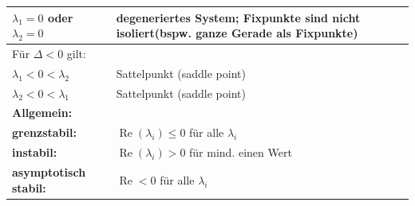 \begin{longtable}{|p{}|p{}|}
	\hline $\lambda_1 = 0$ oder $\lambda_2 = 0$ & degeneriertes System; Fixpunkte sind nicht isoliert(bspw. ganze Gerade als Fixpunkte) \\
	\hline
	
	\multicolumn{2}{l}{Für $\Delta < 0$ gilt:} \\
	
	\hline $\lambda_1 < 0 < \lambda_2$ & Sattelpunkt (saddle point) \\
	\hline $\lambda_2 < 0 < \lambda_1$ & Sattelpunkt (saddle point) \\
	\hline
	
	\multicolumn{2}{l}{\textbf{Allgemein:}}\\
	
	\hline
	\textbf{grenzstabil:} & $\operatorname{Re}(\lambda_i) \leq 0$ für alle $\lambda_i$ \\
	\textbf{instabil:} & $\operatorname{Re}(\lambda_i) > 0$ für mind. einen Wert \\
	\textbf{asymptotisch stabil:} &$\operatorname{Re} < 0$ für alle $\lambda_i$ \\
	\hline
\end{longtable}\\ \\

